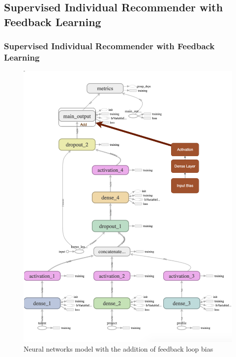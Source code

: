 \documentclass{beamer}
\begin{document}
\subsection{Supervised Individual Recommender with Feedback Learning} 
\begin{frame}
\frametitle{Supervised Individual Recommender with Feedback Learning}
\begin{figure}
	\includegraphics[scale=0.15]{images/TensorBoardFeedback} 
	\caption{Neural networks model with the addition of feedback loop bias}
\end{figure}
\end{frame}
\end{document}
